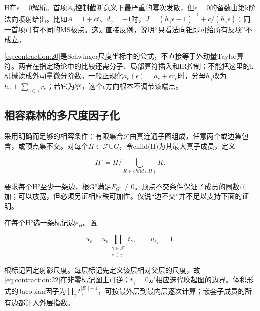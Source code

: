 \documentclass[11pt,a4paper,oneside]{ctexart}
\theoremstyle{cnplain}
\theoremstyle{definition}
\theoremstyle{remark}
\numberwithin{equation}{section}
\begin{document}
H在\(\epsilon =0\)解析。首项\(A_0\)控制截断意义下最严重的幂次发散，但\(\epsilon =0\)的留数由第k阶法向喷射给出。比如\(A=1+c t\)、\(d_\gamma =- 1\)时，\(J=(h_\gamma \epsilon - 1)^{-1}+c/(h_\gamma \epsilon )\)：同一首项可有不同的MS极点。这是直接反例，说明``只看法向锥即可给所有反项''不成立。

\eqref{eq:contraction:20}是Schwinger尺度坐标中的公式，不直接等于外动量Taylor算符。两者在指定场论中的比较还需分子、局部算符插入和IR控制；不能把这里的k机械读成外动量微分阶数。一般正规化\(a_e(\epsilon )=a_e+\epsilon r_e\)时，分母\(h_\gamma \)改为\(h_\gamma +\sum _{e\in \gamma }r_e\)；若它为零，这个\(\epsilon \)方向根本不调节该端点。


\subsection{相容森林的多尺度因子化}\label{sec:contraction:6}

采用明确而足够的相容条件：有限集合\(\mathscr F\)由真连通子图组成，任意两个或边集包含，或顶点集不交。对每个\(H\in \)\(\mathscr F\)\(\cup {G}\)，令child(H)为其最大真子成员，定义

\begin{equation}
H^\circ=H/\bigcup_{K\in child(H)}K.      \label{eq:contraction:21}
\end{equation}

要求每个H°至少一条边，根G°满足\(F_{G^\circ}\ne 0\)。顶点不交条件保证子成员的圈数可加；可以放宽，但必须另证相应秩可加性。仅说``边不交''并不足以支持下面的证明。

在每个H°选一条标记边\(e_H\)。置

\begin{equation}
\alpha_e=u_e\prod_{\substack{\gamma\in\mathscr F\\e\in\gamma}}t_\gamma,
                  \qquad u_{e_H}=1.                             \label{eq:contraction:22}
\end{equation}

根标记固定射影尺度。每层标记先定义该层相对父层的尺度，故\eqref{eq:contraction:22}在非零标记图上可逆；\(t_\gamma =0\)是相应迭代吹起图的边界。体积形式的Jacobian因子为\(\prod _\gamma  t_\gamma ^{|E_\gamma |- 1}\)，可按最外层到最内层逐次计算；嵌套子成员的所有边都计入外层指数。
\end{document}
